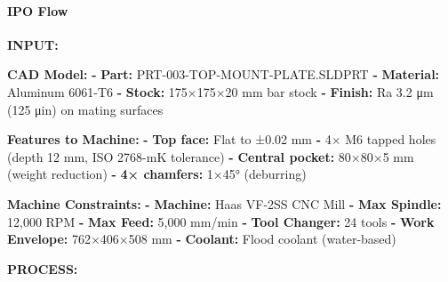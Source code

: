 \documentclass[
]{article}
\newenvironment{Shaded}{\begin{snugshade}}{\end{snugshade}}
\newcommand{\AttributeTok}[1]{\textcolor[rgb]{0.13,0.29,0.53}{#1}}
\newcommand{\FunctionTok}[1]{\textcolor[rgb]{0.13,0.29,0.53}{\textbf{#1}}}
\newcommand{\KeywordTok}[1]{\textcolor[rgb]{0.13,0.29,0.53}{\textbf{#1}}}
\begin{document}
\hypertarget{ipo-flow-1}{%
\paragraph{IPO Flow}\label{ipo-flow-1}}

\textbf{INPUT:}

\begin{Shaded}
\begin{Highlighting}[]
\FunctionTok{CAD Model}\KeywordTok{:}
\AttributeTok{  }\KeywordTok{{-}}\AttributeTok{ }\FunctionTok{Part}\KeywordTok{:}\AttributeTok{ PRT{-}003{-}TOP{-}MOUNT{-}PLATE.SLDPRT}
\AttributeTok{  }\KeywordTok{{-}}\AttributeTok{ }\FunctionTok{Material}\KeywordTok{:}\AttributeTok{ Aluminum 6061{-}T6}
\AttributeTok{  }\KeywordTok{{-}}\AttributeTok{ }\FunctionTok{Stock}\KeywordTok{:}\AttributeTok{ 175×175×20 mm bar stock}
\AttributeTok{  }\KeywordTok{{-}}\AttributeTok{ }\FunctionTok{Finish}\KeywordTok{:}\AttributeTok{ Ra 3.2 μm (125 μin) on mating surfaces}

\FunctionTok{Features to Machine}\KeywordTok{:}
\AttributeTok{  }\KeywordTok{{-}}\AttributeTok{ }\FunctionTok{Top face}\KeywordTok{:}\AttributeTok{ Flat to ±0.02 mm}
\AttributeTok{  }\KeywordTok{{-}}\AttributeTok{ 4× M6 tapped holes (depth 12 mm, ISO 2768{-}mK tolerance)}
\AttributeTok{  }\KeywordTok{{-}}\AttributeTok{ }\FunctionTok{Central pocket}\KeywordTok{:}\AttributeTok{ 80×80×5 mm (weight reduction)}
\AttributeTok{  }\KeywordTok{{-}}\AttributeTok{ }\FunctionTok{4× chamfers}\KeywordTok{:}\AttributeTok{ 1×45° (deburring)}

\FunctionTok{Machine Constraints}\KeywordTok{:}
\AttributeTok{  }\KeywordTok{{-}}\AttributeTok{ }\FunctionTok{Machine}\KeywordTok{:}\AttributeTok{ Haas VF{-}2SS CNC Mill}
\AttributeTok{  }\KeywordTok{{-}}\AttributeTok{ }\FunctionTok{Max Spindle}\KeywordTok{:}\AttributeTok{ 12,000 RPM}
\AttributeTok{  }\KeywordTok{{-}}\AttributeTok{ }\FunctionTok{Max Feed}\KeywordTok{:}\AttributeTok{ 5,000 mm/min}
\AttributeTok{  }\KeywordTok{{-}}\AttributeTok{ }\FunctionTok{Tool Changer}\KeywordTok{:}\AttributeTok{ 24 tools}
\AttributeTok{  }\KeywordTok{{-}}\AttributeTok{ }\FunctionTok{Work Envelope}\KeywordTok{:}\AttributeTok{ 762×406×508 mm}
\AttributeTok{  }\KeywordTok{{-}}\AttributeTok{ }\FunctionTok{Coolant}\KeywordTok{:}\AttributeTok{ Flood coolant (water{-}based)}
\end{Highlighting}
\end{Shaded}

\textbf{PROCESS:}
\end{document}
